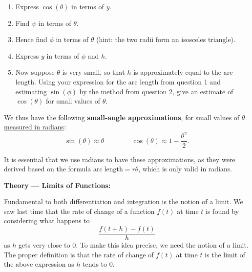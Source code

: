 \documentclass{article}
\begin{document}
\begin{enumerate}
\begin{center}
		\end{center}
		
		\begin{enumerate}
			\item Express $\cos(\theta)$ in terms of $y$.
			\item Find $\psi$ in terms of $\theta$.
			\item Hence find $\phi$ in terms of $\theta$ (hint: the two radii form an isosceles triangle).
			\item Express $y$ in terms of $\phi$ and $h$.
			\item Now suppose $\theta$ is very small, so that $h$ is approximately equal to the arc length. Using your expression for the arc length from question 1 and estimating $					\sin(\phi)$ by the method from question 2, give an estimate of $\cos(\theta)$ for small values of $\theta$.
		\end{enumerate}
\end{enumerate}

\vspace{40mm}

We thus have the following \textbf{small-angle approximations}, for small values of $\theta$ \underline{measured in radians}:
\[\sin(\theta)\approx \theta\qquad\qquad\cos(\theta)\approx 1-\frac{\theta^2}{2}.\]

It is essential that we use radians to have these approximations, as they were derived based on the formula $\mathrm{arc \;length} = r\theta$, which is only valid in radians.




\clearpage


{\bf Theory --- Limits of Functions:}

\vspace{5mm}

Fundamental to both differentiation and integration is the notion of a limit. We saw last time that the rate of change of a function $f(t)$ at time $t$ is found by considering what happens to
\[\frac{f(t+h)-f(t)}{h}\]
as $h$ gets very close to 0. To make this idea precise, we need the notion of a limit. The proper definition is that the rate of change of $f(t)$ at time $t$ is the limit of the above expression as $h$ tends to 0.\bigskip
\end{document}
